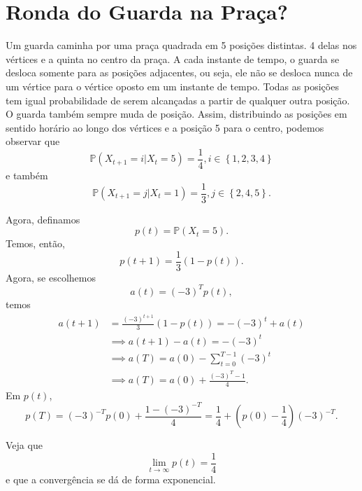 
\section*{Ronda do Guarda na Praça?}

Um guarda caminha por uma praça quadrada em 5 posições distintas. 4 delas nos vértices e a quinta no centro da praça. A cada instante de tempo, o guarda se desloca somente para as posições adjacentes, ou seja, ele não se desloca nunca de um vértice para o vértice oposto em um instante de tempo. Todas as posições tem igual probabilidade de serem alcançadas a partir de qualquer outra posição. O guarda também sempre muda de posição. Assim, distribuindo as posições em sentido horário ao longo dos vértices e a posição 5 para o centro, podemos observar que \[
    \mathbb{P}\left( X_{t+1}=i | X_t=5 \right) = \frac{1}{4}, i \in \left\{ 1,2,3,4 \right\} 
\] e também \[
\mathbb{P}\left( X_{t+1}=j | X_t = 1 \right) = \frac{1}{3}, j \in \left\{ 2,4,5 \right\} 
.\] 

Agora, definamos \[
p(t) = \mathbb{P}\left( X_t = 5 \right) 
.\] Temos, então, \[
p\left( t+1 \right) = \frac{1}{3}\left( 1-p(t) \right) 
.\] Agora, se escolhemos \[
a(t) = \left( -3 \right) ^{T}p(t)
,\] temos
\begin{align*}
    a(t+1) &= \frac{\left( -3 \right)^{t+1}}{3}\left( 1-p(t) \right) = -\left( -3 \right) ^{t} + a(t) \\
	   &\implies a(t+1)-a(t) = -\left( -3 \right) ^{t} \\
	   &\implies a(T) = a(0) - \sum_{t=0}^{T-1} (-3)^{t} \\
	   &\implies a(T) = a(0) + \frac{\left(-3  \right)^{T}-1 }{4}
.\end{align*}
Em $p(t)$, \[
    p(T) = \left( -3 \right) ^{-T}p(0) + \frac{1-\left( -3 \right) ^{-T}}{4} = \frac{1}{4} + \left( p(0)-\frac{1}{4} \right) \left( -3 \right) ^{-T}
.\] 

Veja que \[
\lim_{t \to \infty} p(t) = \frac{1}{4}
\] e que a convergência se dá de forma exponencial.



